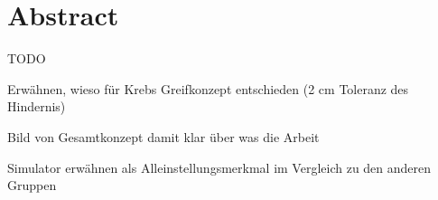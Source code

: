 \newpage
\section{Abstract}

TODO

Erwähnen, wieso für Krebs Greifkonzept entschieden (2 cm Toleranz des Hindernis)

Bild von Gesamtkonzept damit klar über was die Arbeit

Simulator erwähnen als Alleinstellungsmerkmal im Vergleich zu den anderen Gruppen
